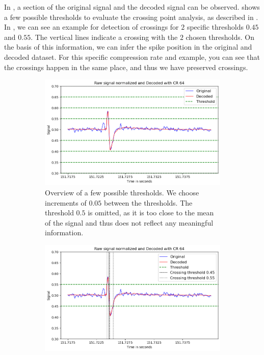 In , a section of the original signal and the decoded signal can be observed.
 shows a few possible thresholds to evaluate the crossing point analysis, as described in .
In , we can see an example for detection of crossings for $2$ specific thresholds $0.45$ and $0.55$. 
The vertical lines indicate a crossing with the $2$ chosen thresholds.
On the basis of this information, we can infer the spike position in the original and decoded dataset.
For this specific compression rate and example, you can see that the crossings happen in the same place, and thus we have preserved crossings.
\begin{figure}[h]
	\centering
	\begin{subfigure}[t]{.49\textwidth} 
		\centering
		\includegraphics[width=\linewidth]{../../Images/Presentation_Segment_CR64_all_thresholds.png}
		\caption{Overview of a few possible thresholds. We choose increments of $0.05$ between the thresholds. The threshold $0.5$ is omitted, as it is too close to the mean of the signal and thus does not reflect any meaningful information.}
		\label{fig:CrossingExample1}
	\end{subfigure}
\hfill
	\begin{subfigure}[t]{.49\textwidth} 
		\centering
		\includegraphics[width=\linewidth]{../../Images/Presentation_Segment_CR64_thresholds_drawn.png}

\end{subfigure}
\end{figure}
